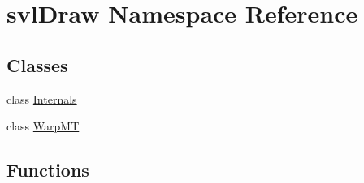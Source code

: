 \hypertarget{namespacesvl_draw}{\section{svl\-Draw Namespace Reference}
\label{namespacesvl_draw}
}
\subsection*{Classes}
\begin{DoxyCompactItemize}
\item 
class \hyperlink{classsvl_draw_1_1_internals}{Internals}
\item 
class \hyperlink{classsvl_draw_1_1_warp_m_t}{Warp\-M\-T}
\end{DoxyCompactItemize}
\subsection*{Functions}
